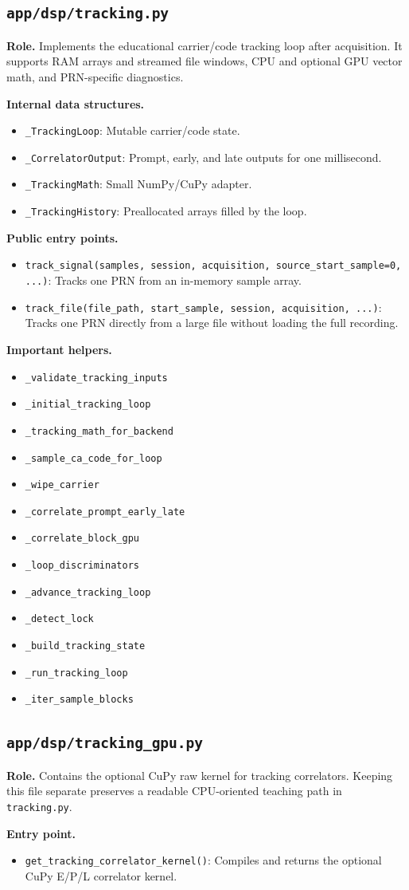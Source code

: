 \documentclass[11pt,a4paper]{article}
\newcommand{\codepath}[1]{\nolinkurl{#1}}
\newcommand{\codeheading}[1]{\texorpdfstring{\codepath{#1}}{#1}}
\newcommand{\codesym}[1]{\nolinkurl{#1}}
\newcommand{\apiitem}[2]{\item \codesym{#1}: #2}
\newcommand{\apisym}[1]{\item \codesym{#1}}
\begin{document}
\subsection{\codeheading{app/dsp/tracking.py}}

\textbf{Role.} Implements the educational carrier/code tracking loop after acquisition. It supports RAM arrays and streamed file windows, CPU and optional GPU vector math, and PRN-specific diagnostics.

\textbf{Internal data structures.}
\begin{itemize}
  \apiitem{\_TrackingLoop}{Mutable carrier/code state.}
  \apiitem{\_CorrelatorOutput}{Prompt, early, and late outputs for one millisecond.}
  \apiitem{\_TrackingMath}{Small NumPy/CuPy adapter.}
  \apiitem{\_TrackingHistory}{Preallocated arrays filled by the loop.}
\end{itemize}

\textbf{Public entry points.}
\begin{itemize}
  \apiitem{track_signal(samples, session, acquisition, source_start_sample=0, ...)}{Tracks one PRN from an in-memory sample array.}
  \apiitem{track_file(file_path, start_sample, session, acquisition, ...)}{Tracks one PRN directly from a large file without loading the full recording.}
\end{itemize}

\textbf{Important helpers.}
\begin{itemize}
  \apisym{\_validate_tracking_inputs}
  \apisym{\_initial_tracking_loop}
  \apisym{\_tracking_math_for_backend}
  \apisym{\_sample_ca_code_for_loop}
  \apisym{\_wipe_carrier}
  \apisym{\_correlate_prompt_early_late}
  \apisym{\_correlate_block_gpu}
  \apisym{\_loop_discriminators}
  \apisym{\_advance_tracking_loop}
  \apisym{\_detect_lock}
  \apisym{\_build_tracking_state}
  \apisym{\_run_tracking_loop}
  \apisym{\_iter_sample_blocks}
\end{itemize}

\subsection{\codeheading{app/dsp/tracking_gpu.py}}

\textbf{Role.} Contains the optional CuPy raw kernel for tracking correlators. Keeping this file separate preserves a readable CPU-oriented teaching path in \codepath{tracking.py}.

\textbf{Entry point.}
\begin{itemize}
  \apiitem{get_tracking_correlator_kernel()}{Compiles and returns the optional CuPy E/P/L correlator kernel.}
\end{itemize}
\end{document}
